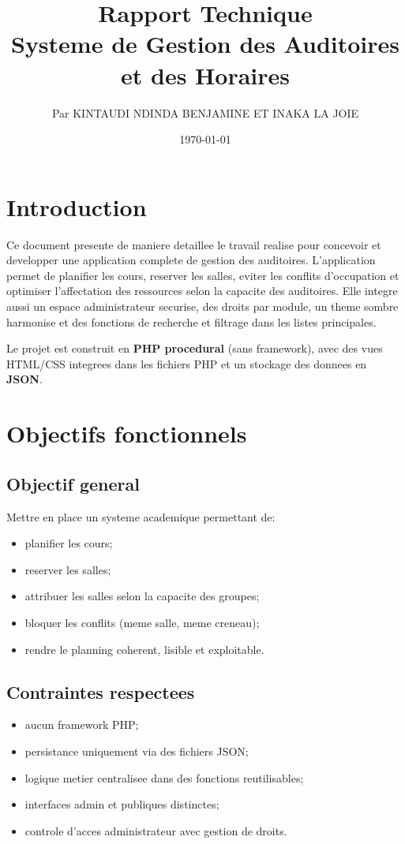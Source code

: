 \documentclass[12pt,a4paper]{article}
\title{Rapport Technique\\\large Systeme de Gestion des Auditoires et des Horaires}
\author{Par KINTAUDI NDINDA BENJAMINE ET INAKA LA JOIE}
\date{\today}
\begin{document}
\maketitle
\thispagestyle{empty}
\newpage
\setcounter{page}{0}

\tableofcontents
\thispagestyle{empty}
\newpage

\setcounter{page}{1}

\section{Introduction}
Ce document presente de maniere detaillee le travail realise pour concevoir et developper une application complete de gestion des auditoires.
L'application permet de planifier les cours, reserver les salles, eviter les conflits d'occupation et optimiser l'affectation des ressources selon la capacite des auditoires.
Elle integre aussi un espace administrateur securise, des droits par module, un theme sombre harmonise et des fonctions de recherche et filtrage dans les listes principales.

Le projet est construit en \textbf{PHP procedural} (sans framework), avec des vues HTML/CSS integrees dans les fichiers PHP et un stockage des donnees en \textbf{JSON}.

\section{Objectifs fonctionnels}
\subsection{Objectif general}
Mettre en place un systeme academique permettant de:
\begin{itemize}[leftmargin=1.2cm]
    \item planifier les cours;
    \item reserver les salles;
    \item attribuer les salles selon la capacite des groupes;
    \item bloquer les conflits (meme salle, meme creneau);
    \item rendre le planning coherent, lisible et exploitable.
\end{itemize}

\subsection{Contraintes respectees}
\begin{itemize}[leftmargin=1.2cm]
    \item aucun framework PHP;
    \item persistance uniquement via des fichiers JSON;
    \item logique metier centralisee dans des fonctions reutilisables;
    \item interfaces admin et publiques distinctes;
    \item controle d'acces administrateur avec gestion de droits.
\end{itemize}
\end{document}
